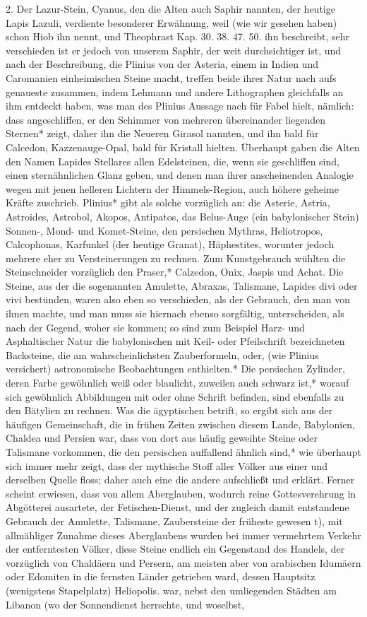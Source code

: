 \documentclass[a4paper, 11pt, oneside, polutonikogreek, german]{article}
\begin{document}
2. Der Lazur-Stein, Cyanus, den die Alten auch Saphir nannten, der heutige Lapis Lazuli, verdiente besonderer Erwähnung, weil (wie wir gesehen haben) schon Hiob ihn nennt, und Theophrast Kap. 30. 38. 47. 50. ihn beschreibt, sehr verschieden ist er jedoch von unserem Saphir, der weit durchsichtiger ist, und nach der Beschreibung, die Plinius von der Asteria, einem in Indien und Caromanien einheimischen Steine macht, treffen beide ihrer Natur nach aufs genaueste zusammen, indem Lehmann und andere Lithographen gleichfalls an ihm entdeckt haben, was man des Plinius Aussage nach für Fabel hielt, nämlich: dass angeschliffen, er den Schimmer von mehreren übereinander liegenden Sternen* zeigt, daher ihn die Neueren Girasol nannten, und ihn bald für Calcedon, Kazzenauge-Opal, bald für Kristall hielten. Überhaupt gaben die Alten den Namen Lapides Stellares allen Edelsteinen, die, wenn sie geschliffen sind, einen sternähnlichen Glanz geben, und denen man ihrer anscheinenden Analogie wegen mit jenen helleren Lichtern der Himmels-Region, auch höhere geheime Kräfte zuschrieb. Plinius* gibt als solche vorzüglich an: die Asterie, Astria, Astroides, Astrobol, Akopos, Antipatos, das Belus-Auge (ein babylonischer Stein) Sonnen-, Mond- und Komet-Steine, den persischen Mythras, Heliotropos, Calcophonas, Karfunkel (der heutige Granat), Häphestites, worunter jedoch mehrere eher zu Versteinerungen zu rechnen. Zum Kunstgebrauch wühlten die Steinschneider vorzüglich den Praser,* Calzedon, Onix, Jaspis und Achat. Die Steine, aus der die sogenannten Amulette, Abraxas, Talismane, Lapides divi oder vivi bestünden, waren also eben so verschieden, als der Gebrauch, den man von ihnen machte, und man muss sie hiernach ebenso sorgfältig, unterscheiden, als nach der Gegend, woher sie kommen; so sind zum Beispiel Harz- und Asphaltischer Natur die babylonischen mit Keil- oder Pfeilschrift bezeichneten Backsteine, die am wahrscheinlichsten Zauberformeln, oder, (wie Plinius versichert) astronomische Beobachtungen enthielten.* Die persischen Zylinder, deren Farbe gewöhnlich weiß oder blaulicht, zuweilen auch schwarz ist,* worauf sich gewöhnlich Abbildungen mit oder ohne Schrift befinden, sind ebenfalls zu den Bätylien zu rechnen. Was die ägyptischen betrift, so ergibt sich aus der häufigen Gemeinschaft, die in frühen Zeiten zwischen diesem Lande, Babylonien, Chaldea und Persien war, dass von dort aus häufig geweihte Steine oder Talismane vorkommen, die den persischen auffallend ähnlich sind,* wie überhaupt sich immer mehr zeigt, dass der mythische Stoff aller Völker aus einer und derselben Quelle floss; daher auch eine die andere aufschließt und erklärt. Ferner scheint erwiesen, dass von allem Aberglauben, wodurch reine Gottesverehrung in Abgötterei ausartete, der Fetischen-Dienst, und der zugleich damit entstandene Gebrauch der Amulette, Talismane, Zaubersteine der früheste gewesen t), mit allmähliger Zunahme dieses Aberglaubens wurden bei immer vermehrtem Verkehr der entferntesten Völker, diese Steine endlich ein Gegenstand des Handels, der vorzüglich von Chaldäern und Persern, am meisten aber von arabischen Idumäern oder Edomiten in die fernsten Länder getrieben ward, dessen Hauptsitz (wenigstens Stapelplatz) Heliopolis. war, nebst den umliegenden Städten am Libanon (wo der Sonnendienst herrschte, und woselbst, 
\end{document}
